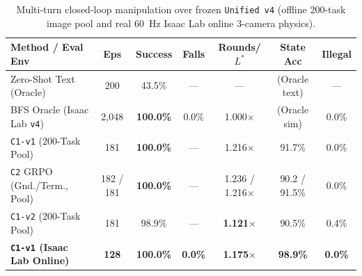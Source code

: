 \begin{table}[t]
  \centering
  \caption{Multi-turn closed-loop manipulation over frozen \texttt{Unified v4} (offline 200-task image pool and real 60~Hz Isaac Lab online 3-camera physics).}
  \label{tab:vlm_closedloop}
  \footnotesize
  \setlength{\tabcolsep}{3.5pt}
  \begin{tabular*}{\linewidth}{@{\extracolsep{\fill}}lcccccc}
    \toprule
    Method / Eval Env & Eps & Success & Falls & Rounds/$L^*$ & State Acc & Illegal \\
    \midrule
    Zero-Shot Text (Oracle) & 200 & 43.5\% & --- & --- & (Oracle text) & --- \\
    BFS Oracle (Isaac Lab \texttt{v4}) & 2,048 & \textbf{100.0\%} & 0.0\% & 1.000$\times$ & (Oracle sim) & 0.0\% \\
    \midrule
    \texttt{C1-v1} (200-Task Pool) & 181 & \textbf{100.0\%} & --- & 1.216$\times$ & 91.7\% & 0.0\% \\
    \texttt{C2} GRPO (Gnd./Term., Pool) & 182 / 181 & \textbf{100.0\%} & --- & 1.236 / 1.216$\times$ & 90.2 / 91.5\% & 0.0\% \\
    \texttt{C1-v2} (200-Task Pool) & 181 & 98.9\% & --- & \textbf{1.121$\times$} & 90.5\% & 0.4\% \\
    \textbf{\texttt{C1-v1} (Isaac Lab Online)} & \textbf{128} & \textbf{100.0\%} & \textbf{0.0\%} & \textbf{1.175$\times$} & \textbf{98.9\%} & \textbf{0.0\%} \\
    \bottomrule
  \end{tabular*}
\end{table}
